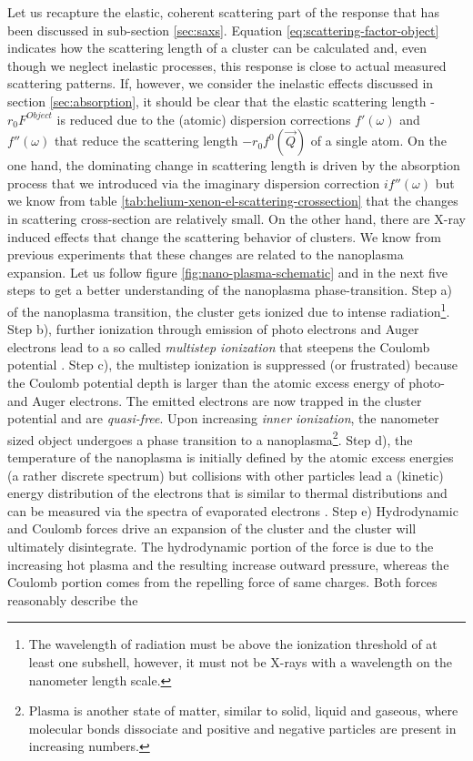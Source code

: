  Let us recapture the elastic, coherent scattering part of the response that has been discussed in sub-section \ref{sec:saxs}. Equation \eqref{eq:scattering-factor-object} indicates how the scattering length of a cluster can be calculated and, even though we neglect inelastic processes, this response is close to actual measured scattering patterns. If, however, we consider the inelastic effects discussed in section \ref{sec:absorption}, it should be clear that the elastic scattering length -$r_{0}F^{Object}$ is reduced due to the (atomic) dispersion corrections $f'\left(\omega\right)$ and $f''\left(\omega\right)$ that reduce the scattering length $-r_{0}f^{0}\left(\vec{Q}\right)$ of a single atom. On the one hand, the dominating change in scattering length is driven by the absorption process that we introduced via the imaginary dispersion correction $i f''\left(\omega\right)$ but we know from table \ref{tab:helium-xenon-el-scattering-crossection} that the changes in scattering cross-section are relatively small. On the other hand, there are X-ray induced effects that change the scattering behavior of clusters. We know from previous experiments \citep{Gorkhover-2016-NatPho} that these changes are related to the nanoplasma expansion. Let us follow figure \ref{fig:nano-plasma-schematic} and \citep{Arbeiter-2011-NJP,Bostedt-2010-JPB} in the next five steps to get a better understanding of the nanoplasma phase-transition. Step a) of the nanoplasma transition, the cluster gets ionized due to intense radiation\footnote{The wavelength of radiation must be above the ionization threshold of at least one subshell, however, it must not be X-rays with a wavelength on the nanometer length scale.}. Step b), further ionization through emission of photo electrons and Auger electrons lead to a so called \textit{multistep ionization} that steepens the Coulomb potential \citep{Wabnitz-2002-Nature,Laarmann-2004-PRL,Bostedt-2008-PRL}. Step c), the multistep ionization is suppressed (or frustrated) because the Coulomb potential depth is larger than the atomic excess energy of photo- and Auger electrons. The emitted electrons are now trapped in the cluster potential and are \textit{quasi-free}. Upon increasing \textit{inner ionization}, the nanometer sized object undergoes a phase transition to a nanoplasma\footnote{Plasma is another state of matter, similar to solid, liquid and gaseous, where molecular bonds dissociate and positive and negative particles are present in increasing numbers.}. Step d), the temperature of the nanoplasma is initially defined by the atomic excess energies (a rather discrete spectrum) but collisions with other particles lead a (kinetic) energy distribution of the electrons that is similar to thermal distributions and can be measured via the spectra of evaporated electrons \citep{Laarmann-2005-PRL,Bostedt-2010-NJP}. Step e) Hydrodynamic and Coulomb forces drive an expansion of the cluster and the cluster will ultimately disintegrate. The hydrodynamic portion of the force is due to the increasing hot plasma and the resulting increase outward pressure, whereas the Coulomb portion comes from the repelling force of same charges. Both forces reasonably describe the 